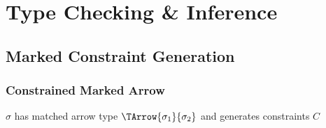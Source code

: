 
















\section{Type Checking \& Inference}
\label{sec:type-inference}

\subsection{Marked Constraint Generation}

\subsubsection{Constrained Marked Arrow}

 $\sigma$ has matched arrow type $\TArrow{\sigma_1}{\sigma_2}$ and generates constraints $C$
\begin{mathpar}

\end{mathpar}


